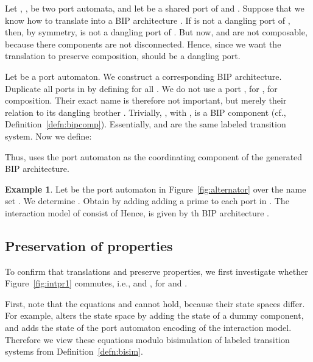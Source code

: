 \documentclass[submission,copyright,creativecommons,hidelinks]{eptcs}
\theoremstyle{plain} \newtheorem{theorem}{Theorem}
\theoremstyle{definition}
\newtheorem{example}{Example}
\theoremstyle{remark}
\newcommand{\defn}[1]{Definition~\ref{defn:#1}}
\newcommand{\fig}[2][]{Figure~\ref{fig:#2}\ensuremath{#1}}
\begin{document}
Let , , be two port automata, and let  be a shared port of  and . Suppose that we know how to translate  into a BIP architecture . If  is not a dangling port of , then, by symmetry,  is not a dangling port of . But now,  and  are not composable, because there components are not disconnected. Hence, since we want the translation to preserve composition,  should be a dangling port.

Let  be a port automaton. We construct a corresponding BIP architecture. Duplicate all ports in  by defining  for all . We do not use a port , for , for composition. Their exact name is therefore not important, but merely their relation to its dangling brother . Trivially, , with , is a BIP component (cf., \defn{bipcomp}). Essentially,  and  are the same labeled transition system. Now we define:

Thus,  uses the port automaton as the coordinating component of the generated BIP architecture.

\begin{example}
Let  be the port automaton in \fig{alternator} over the name set . We determine . Obtain  by adding adding a prime to each port in . The interaction model of  consist of  Hence,  is given by th BIP architecture .
\end{example}


\subsection{Preservation of properties}

To confirm that translations  and  preserve properties, we first investigate whether \fig{intpr1} commutes, i.e.,  and , for  and .

First, note that the equations  and  cannot hold, because their state spaces differ. For example,  alters the state space by adding the state of a dummy component, and  adds the state of the port automaton encoding of the interaction model. Therefore we view these equations modulo bisimulation of labeled transition systems from \defn{bisim}.
\end{document}
